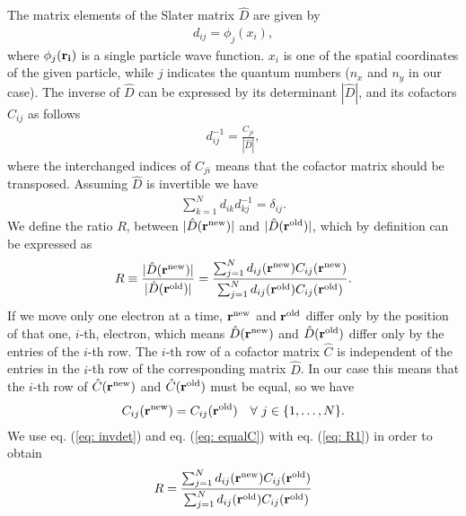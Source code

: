 \documentclass[../main.tex]{subfiles}
\begin{document}
\begin{appendices}
The matrix elements of the Slater matrix $\hat{D}$ are given by 
\begin{align}
    d_{ij} = \phi_j(x_i),
\end{align}
where $\phi_j({\bf r_i})$ is a single particle wave function. $x_i$ is one of the spatial coordinates of the given particle, while $j$ indicates the quantum numbers ($n_x$ and $n_y$ in our case).
The inverse of $\hat{D}$ can be expressed by its determinant $|\hat{D}|$, and its cofactors $C_{ij}$ as follows
\begin{align}\label{eq: invdet}
    d_{ij}^{-1} = \frac{C_{ji}}{|\hat{D}|}, 
\end{align}
where the interchanged indices of $C_{ji}$ means that the cofactor matrix should be transposed. Assuming $\hat{D}$ is invertible we have
\begin{align}\label{eq: unity}
    \sum_{k=1}^N d_{ik}d_{kj}^{-1} = \delta_{ij}.
\end{align}
We define the ratio $R$, between $|\hat{D}({\bf r}^{\textrm{new}})|$ and $|\hat{D}({\bf r}^{\textrm{old}})|$, which by definition can be expressed as
\begin{align}\label{eq: R1}
    R \equiv \frac{|\hat{D}({\bf r}^{\textrm{new}})|}{|\hat{D}({\bf r}^{\textrm{old}})|} 
    = \frac{\sum_{j=1}^N d_{ij}({\bf r}^{\textrm{new}}) C_{ij}({\bf r}^{\textrm{new}})}{\sum_{j=1}^N d_{ij}({\bf r}^{\textrm{old}}) C_{ij}({\bf r}^{\textrm{old}})}.
\end{align}
If we move only one electron at a time, ${\bf r}^{\textrm{new}}$ and ${\bf r}^{\textrm{old}}$ differ only by the position of that one, $i$-th, electron, which means $\hat{D}({\bf r}^{\textrm{new}})$ and $\hat{D}({\bf r}^{\textrm{old}})$ differ only by the entries of the $i$-th row. The $i$-th row of a cofactor matrix $\hat{C}$ is independent of the entries in the $i$-th row of the corresponding matrix $\hat{D}$. In our case this means that the $i$-th row of $\hat{C}({\bf r}^{\textrm{new}})$ and $\hat{C}({\bf r}^{\textrm{old}})$ must be equal, so we have 
\begin{align}\label{eq: equalC}
    C_{ij}({\bf r}^{\textrm{new}}) = C_{ij}({\bf r}^{\textrm{old}})\quad \forall \ j \in \{1, \dots, N\}.
\end{align}
We use eq. (\ref{eq: invdet}) and eq. (\ref{eq: equalC}) with eq. (\ref{eq: R1}) in order to obtain
\begin{align}
    R = \frac{\sum_{j=1}^N d_{ij}({\bf r}^{\textrm{new}}) C_{ij}({\bf r}^{\textrm{old}})}{\sum_{j=1}^N d_{ij}({\bf r}^{\textrm{old}}) C_{ij}({\bf r}^{\textrm{old}})} 

\end{align}
\end{appendices}
\end{document}
